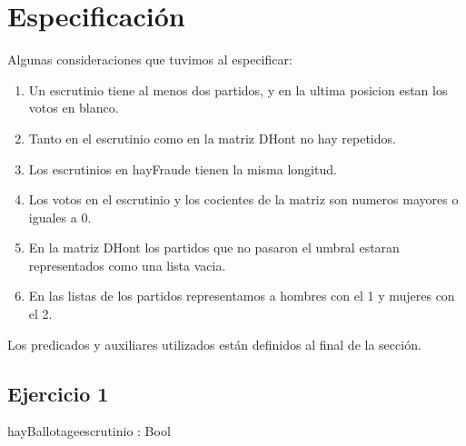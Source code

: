 \documentclass[10pt,a4paper]{article}
\begin{document}
\maketitle

\section{Especificación}

\noindent Algunas consideraciones que tuvimos al especificar:
\begin{enumerate} \setlength\itemsep{0cm}
	\item Un escrutinio tiene al menos dos partidos, y en la ultima posicion estan los votos en blanco.
	\item Tanto en el escrutinio como en la matriz DHont no hay repetidos.
	\item Los escrutinios en hayFraude tienen la misma longitud.
	\item Los votos en el escrutinio y los cocientes de la matriz son numeros mayores o iguales a 0.
	\item En la matriz DHont los partidos que no pasaron el umbral estaran representados como una lista vacia.
	\item En las listas de los partidos representamos a hombres con el 1 y mujeres con el 2.
\end{enumerate}
Los predicados y auxiliares utilizados están definidos al final de la sección. \\

\subsection{Ejercicio 1}

\begin{proc}{hayBallotage}{\In escrutinio : \TLista{\ent}}{Bool}
\end{proc}
\end{document}

